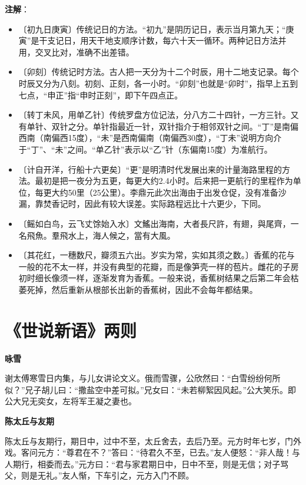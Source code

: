 \documentclass[12pt,UTF-8,openany,a4]{ctexbook}
\begin{document}
\newpage

\begin{Large}
   \noindent \textbf{注解}：
\end{Large}

\vspace{-1em}

\begin{itemize}
    \setlength\itemsep{-0.2em}
    \item〔初九日庚寅〕{\yiwen 传统记日的方法。“初九”是阴历记日，表示当月第九天；“庚寅”是干支记日，用天干地支顺序计数，每六十天一循环。两种记日方法并用，交叉比对，准确不出差错。}
    \item〔卯刻〕{\yiwen 传统记时方法。古人把一天分为十二个时辰，用十二地支记录。每个时辰又分为八刻。初刻、正刻，各一小时。“卯刻”也就是“卯时”，指早上五到七点，“申正”指“申时正刻”，即下午四点正。}
    \item〔转丁未风，用单乙针〕{\yiwen 传统罗盘方位记法，分八方二十四针，一方三针。又有单针、双针之分。单针指最近一针，双针指介于相邻双针之间。“丁”是南偏西南（南偏西15度），“未”是西南偏南（南偏西30度），“丁未”说明方向介于“丁”、“未”之间。“单乙针”表示以“乙”针（东偏南15度）为准航行。}
    \item〔计自开洋，行船十六更矣〕{\yiwen “更”是明清时代发展出来的计量海路里程的方法。最初是把一夜分为五更，每更大约2.4小时。后来把一更航行的里程作为单位，每更大约50里（25公里）。李鼎元此次出海由于出发仓促，没有准备沙漏，靠焚香记时，因此有较大误差。实际路程远比十六更少，下同。}
    \item〔鳐如白鸟，云飞丈馀始入水〕{\yiwen 文鰩出海南，大者長尺許，有翅，與尾齊，一名飛魚。羣飛水上，海人候之，當有大風。}
    \item〔其花红，一穗数尺，瓣须五六出。岁实为常，实如其须之数。〕{\yiwen 香蕉的花与一般的花不太一样，并没有典型的花瓣，而是像笋壳一样的苞片。雌花的子房初时细长像须一样，逐渐发育为香蕉。一般来说，香蕉树结果之后第二年会枯萎死掉，然后重新从根部长出新的香蕉树，因此不会每年都结果。}
\end{itemize}

\chapter{《世说新语》两则}

\begin{large}
    
    \begin{center}{\Large\textbf{咏雪}}\end{center}
    
    谢太傅寒雪日内集，与儿女讲论文义。俄而雪骤，公欣然曰：“白雪纷纷何所似？”兄子胡儿曰：“撒盐空中差可拟。”兄女曰：“未若柳絮因风起。”公大笑乐。即公大兄无奕女，左将军王凝之妻也。
    
    \begin{center}{\Large\textbf{陈太丘与友期}}\end{center}
    
    陈太丘与友期行，期日中，过中不至，太丘舍去，去后乃至。元方时年七岁，门外戏。客问元方：“尊君在不？”答曰：“待君久不至，已去。”友人便怒：“非人哉！与人期行，相委而去。”元方曰：“君与家君期日中，日中不至，则是无信；对子骂父，则是无礼。”友人惭，下车引之，元方入门不顾。

\end{large}
\end{document}
